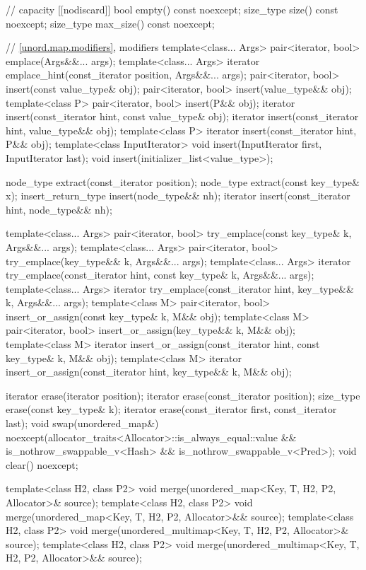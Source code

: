 \begin{codeblock}
{{    // capacity
    [[nodiscard]] bool empty() const noexcept;
    size_type size() const noexcept;
    size_type max_size() const noexcept;

    // \ref{unord.map.modifiers}, modifiers
    template<class... Args> pair<iterator, bool> emplace(Args&&... args);
    template<class... Args> iterator emplace_hint(const_iterator position, Args&&... args);
    pair<iterator, bool> insert(const value_type& obj);
    pair<iterator, bool> insert(value_type&& obj);
    template<class P> pair<iterator, bool> insert(P&& obj);
    iterator       insert(const_iterator hint, const value_type& obj);
    iterator       insert(const_iterator hint, value_type&& obj);
    template<class P> iterator insert(const_iterator hint, P&& obj);
    template<class InputIterator> void insert(InputIterator first, InputIterator last);
    void insert(initializer_list<value_type>);

    node_type extract(const_iterator position);
    node_type extract(const key_type& x);
    insert_return_type insert(node_type&& nh);
    iterator           insert(const_iterator hint, node_type&& nh);

    template<class... Args>
      pair<iterator, bool> try_emplace(const key_type& k, Args&&... args);
    template<class... Args>
      pair<iterator, bool> try_emplace(key_type&& k, Args&&... args);
    template<class... Args>
      iterator try_emplace(const_iterator hint, const key_type& k, Args&&... args);
    template<class... Args>
      iterator try_emplace(const_iterator hint, key_type&& k, Args&&... args);
    template<class M>
      pair<iterator, bool> insert_or_assign(const key_type& k, M&& obj);
    template<class M>
      pair<iterator, bool> insert_or_assign(key_type&& k, M&& obj);
    template<class M>
      iterator insert_or_assign(const_iterator hint, const key_type& k, M&& obj);
    template<class M>
      iterator insert_or_assign(const_iterator hint, key_type&& k, M&& obj);

    iterator  erase(iterator position);
    iterator  erase(const_iterator position);
    size_type erase(const key_type& k);
    iterator  erase(const_iterator first, const_iterator last);
    void      swap(unordered_map&)
      noexcept(allocator_traits<Allocator>::is_always_equal::value &&
               is_nothrow_swappable_v<Hash> &&
               is_nothrow_swappable_v<Pred>);
    void      clear() noexcept;

    template<class H2, class P2>
      void merge(unordered_map<Key, T, H2, P2, Allocator>& source);
    template<class H2, class P2>
      void merge(unordered_map<Key, T, H2, P2, Allocator>&& source);
    template<class H2, class P2>
      void merge(unordered_multimap<Key, T, H2, P2, Allocator>& source);
    template<class H2, class P2>
      void merge(unordered_multimap<Key, T, H2, P2, Allocator>&& source);

}}
\end{codeblock}
